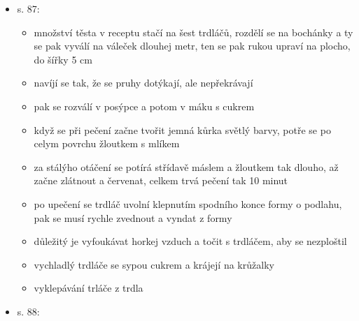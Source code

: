 \begin{itemize}
\begin{itemize}
    \begin{itemize}
    \tightlist
    \item
       na trdláče na živym ohni
    \item
      těsto z polohrubý mouky, cukru, vanilkovýho cukru, mlíka, kvasnic,
      když začne kynout, přidají se žloutky, šlehačka a rozpuštěný máslo
    \item
      forma na trdelník je dlouhá 55 cm a je kónická
    \item
      nahřívá se nad ohněm, aby se odstranil starý tuk a aby trdláč šel
      vyklepat z formy
    \item
      posýpka je z másla, mouky a jednoho žloutku. Cukru se dá málo,
      protože karamelizuje a posýpka tvrdne
    \item
      k makování se smýchá celej mák a moučkovej cukr
    \item
      na potírání se ušlehají žloutky s mlíkem a špetkou cukru
    \item
      taky se rozpustí máslo na pomašťování
    \item
       opékání trdláče nad ohněm, M. Drgová, 1982,
      ÚLUV
    \end{itemize}
  \item
    s. 87:

    \begin{itemize}
    \tightlist
    \item
      množství těsta v receptu stačí na šest trdláčů, rozdělí se na
      bochánky a ty se pak vyválí na váleček dlouhej metr, ten se pak
      rukou upraví na plocho, do šířky 5 cm
    \item
      navíjí se tak, že se pruhy dotýkají, ale nepřekrávají
    \item
      pak se rozválí v posýpce a potom v máku s cukrem
    \item
      když se při pečení začne tvořit jemná kůrka světlý barvy, potře se
      po celym povrchu žloutkem s mlíkem
    \item
      za stálýho otáčení se potírá střídavě máslem a žloutkem tak
      dlouho, až začne zlátnout a červenat, celkem trvá pečení tak 10
      minut
    \item
      po upečení se trdláč uvolní klepnutím spodního konce formy o
      podlahu, pak se musí rychle zvednout a vyndat z formy
    \item
      důležitý je vyfoukávat horkej vzduch a točit s trdláčem, aby se
      nezploštil
    \item
      vychladlý trdláče se sypou cukrem a krájejí na krůžalky
    \item
       vyklepávání trláče z trdla
    \end{itemize}
  \item
    s. 88:


\end{itemize}
\end{itemize}
